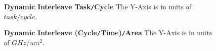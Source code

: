 \begin{figure}
\centering
{}
\caption{{\bf Dynamic Interleave Task{\tt /}Cycle} The Y-Axis is in units of $task/cycle$.}
\label{fig:dynamicTaskPerCycle}
\centering
{}
\caption{{\bf Dynamic Interleave (Cycle{\tt /}Time){\tt /}Area} The Y-Axis is in units of $GHz/um^2$.}
\label{fig:dynamicFreqPerArea}
\end{figure}

